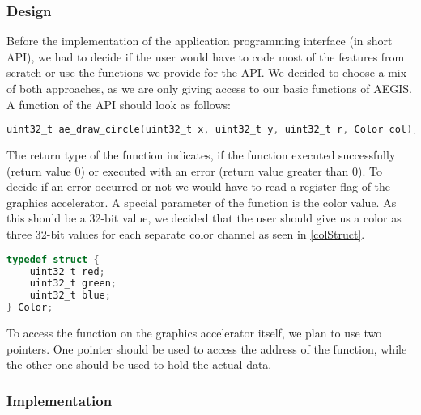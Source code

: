 \subsubsection*{Design}

Before the implementation of the application programming interface (in short API), we had to decide if the user would have to code most of the features from scratch or use the functions we provide for the API.
We decided to choose a mix of both approaches, as we are only giving access to our basic functions of AEGIS. A function of the API should look as follows:
\begin{lstlisting}[language=C, caption={The Circle Drawing Function}, label=CircDraw]
uint32_t ae_draw_circle(uint32_t x, uint32_t y, uint32_t r, Color col);
\end{lstlisting}
The return type of the function indicates, if the function executed successfully (return value \(0\)) or executed with an error (return value greater than \(0\)). To decide if an error occurred or not we would have to read a register flag of the graphics accelerator. A special parameter of the function is the color value. As this should be a 32-bit value, we decided that the user should give us a color as three 32-bit values for each separate color channel as seen in \cref{colStruct}.
\begin{lstlisting}[language=C, caption={The Color Stuct}, label=colStruct]
typedef struct {
	uint32_t red;
	uint32_t green;
	uint32_t blue;
} Color;
\end{lstlisting}

To access the function on the graphics accelerator itself, we plan to use two pointers. One pointer should be used to access the address of the function, while the other one should be used to hold the actual data. 

\subsubsection*{Implementation}

